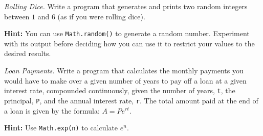 \documentclass[11pt]{exam}
\newcommand{\ColorQuestion}[2]{\renewcommand{\questionlabel}{\colorbox{#1}{\color{white}\bfseries\thequestion}\hfill}\question #2}
\newcommand{\YellowQuestion}[1]{\ColorQuestion{Goldenrod}{#1}}
\newcommand{\RedQuestion}[1]{\ColorQuestion{BrickRed}{#1}}
\begin{document}
\begin{questions}
		\YellowQuestion{\emph{Rolling Dice.} Write a program that generates and prints two random integers between $1$ and $6$ (as if you were rolling dice).}
		
		{\small\textbf{Hint:} You can use \lstinline{Math.random()} to generate a random number. Experiment with its output before deciding how you can use it to restrict your values to the desired results.}

		\RedQuestion{\emph{Loan Payments.} Write a program that calculates the monthly payments you would have to make over a given number of years to pay off a loan at a given interest rate, compounded continuously, given the number of years, \lstinline{t}, the principal, \lstinline{P}, and the annual interest rate, \lstinline{r}. The total amount paid at the end of a loan is given by the formula: $A = Pe^{rt}$.}
		
		{\small\textbf{Hint:} Use \lstinline{Math.exp(n)} to calculate $e^n$.}

	\end{questions}
\end{document}
